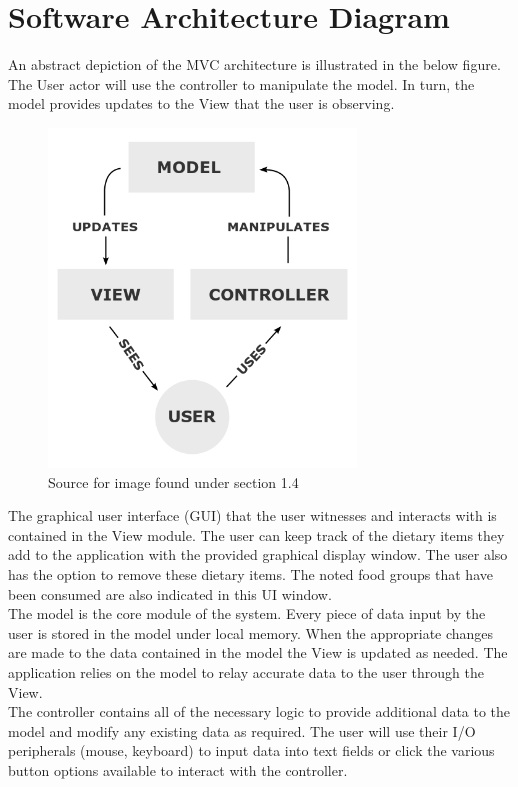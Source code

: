 \documentclass{scrreprt}
\begin{document}
\section{Software Architecture Diagram}

An abstract depiction of the MVC architecture is illustrated in the below figure. The User actor will use the controller to manipulate the model. In turn, the model provides updates to the View that the user is observing.

\begin{figure}[ht]
\centering
\includegraphics[height=9cm]{pictures/MVC-Process.png}
\caption{Source for image found under section 1.4}
\end{figure}

The graphical user interface (GUI) that the user witnesses and interacts with is contained in the View module. The user can keep track of the dietary items they add to the application with the provided graphical display window. The user also has the option to remove these dietary items. The noted food groups that have been consumed are also indicated in this UI window. \\

The model is the core module of the system. Every piece of data input by the user is stored in the model under local memory. When the appropriate changes are made to the data contained in the model the View is updated as needed. The application relies on the model to relay accurate data to the user through the View. \\

The controller contains all of the necessary logic to provide additional data to the model and modify any existing data as required. The user will use their I/O peripherals (mouse, keyboard) to input data into text fields or click the various button options available to interact with the controller.
\end{document}
